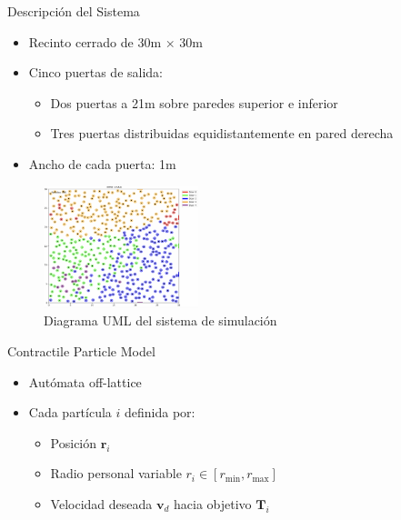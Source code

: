 \documentclass[aspectratio=169]{beamer}
\begin{document}
\begin{frame}{Descripción del Sistema}
    \begin{itemize}
        \item Recinto cerrado de 30m × 30m
        \item Cinco puertas de salida:
        \begin{itemize}
            \item Dos puertas a 21m sobre paredes superior e inferior
            \item Tres puertas distribuidas equidistantemente en pared derecha
        \end{itemize}
        \item Ancho de cada puerta: 1m
    \end{itemize}
    \begin{figure}
        \centering
        \includegraphics[width=0.4\textwidth]{img/frames/t_40_&_p_0.50.jpg}
        \caption{Diagrama UML del sistema de simulación}
    \end{figure}
\end{frame}

\begin{frame}{Contractile Particle Model}
    \begin{itemize}
        \item Autómata off-lattice
        \item Cada partícula $i$ definida por:
        \begin{itemize}
            \item Posición $\mathbf{r}_i$
            \item Radio personal variable $r_i \in [r_{\text{min}}, r_{\text{max}}]$
            \item Velocidad deseada $\mathbf{v}_d$ hacia objetivo $\mathbf{T}_i$
        \end{itemize}
    \end{itemize}
\end{frame}
\end{document}
